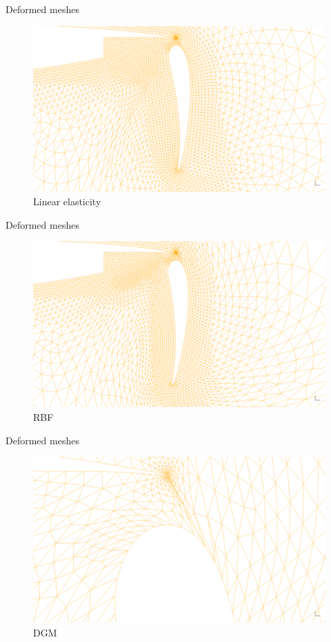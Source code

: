 \documentclass[mathserif]{beamer}
\begin{document}
\begin{frame}{Deformed meshes}
\begin{figure}
\includegraphics[scale=0.2]{movedwing-elast--60-2}
\caption{Linear elasticity}
\end{figure}
\end{frame}

\begin{frame}{Deformed meshes}
\begin{figure}
\includegraphics[scale=0.2]{movedwing-rbf--60-2}
\caption{RBF}
\end{figure}
\end{frame}


\begin{frame}{Deformed meshes}
\begin{figure}
\includegraphics[scale=0.18]{movedwing-dgm--60}
\caption{DGM}
\end{figure}
\end{frame}
\end{document}
